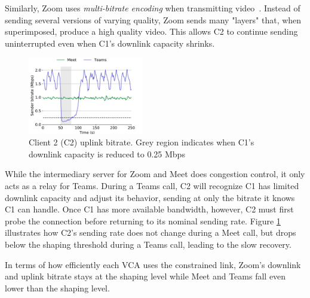 Similarly, Zoom uses \textit{multi-bitrate encoding} when transmitting video~\cite{zoom_encoding}. Instead of sending several versions of varying quality, Zoom sends many "layers" that, when superimposed, produce a high quality video. This allows C2 to continue sending uninterrupted even when C1's downlink capacity shrinks. 

\begin{figure}[t]
    \centering
    \includegraphics[width=0.45\textwidth,keepaspectratio]{../figures/interrupt/Interrupt-sender.pdf}
    \caption{Client 2 (C2) uplink bitrate. Grey region indicates when C1's downlink capacity is reduced to 0.25 Mbps}
    \label{fig:interrupt-sender}
\end{figure}

While the intermediary server for Zoom and Meet does congestion control, it only acts as a relay for Teams. During a Teams call, C2 will recognize C1 has limited downlink capacity and adjust its behavior, sending at only the bitrate it knows C1 can handle. Once C1 has more available bandwidth, however, C2 must first probe the connection before returning to its nominal sending rate. Figure \ref{fig:interrupt-sender} illustrates how C2's sending rate does not change during a Meet call, but drops below the shaping threshold during a Teams call, leading to the slow recovery.

In terms of how efficiently each VCA uses the constrained link, Zoom's downlink and uplink bitrate stays at the shaping level while Meet and Teams fall even lower than the shaping level. 






